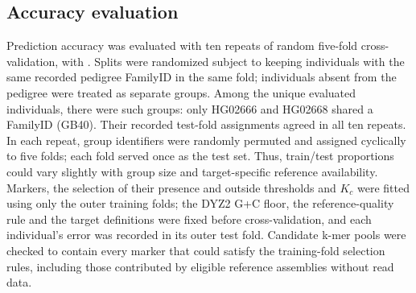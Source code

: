 \subsection{Accuracy evaluation}\label{sec:m-benchmark}
Prediction accuracy was evaluated with ten repeats of random five-fold cross-validation, with . Splits were randomized subject to keeping individuals with the same recorded pedigree FamilyID in the same fold; individuals absent from the pedigree were treated as separate groups. Among the  unique evaluated individuals, there were  such groups: only HG02666 and HG02668 shared a FamilyID (GB40). Their recorded test-fold assignments agreed in all ten repeats. In each repeat, group identifiers were randomly permuted and assigned cyclically to five folds; each fold served once as the test set. Thus, train/test proportions could vary slightly with group size and target-specific reference availability. Markers, the selection of their presence and outside thresholds and $K_c$ were fitted using only the outer training folds; the DYZ2 G+C floor, the reference-quality rule and the target definitions were fixed before cross-validation, and each individual's error was recorded in its outer test fold. Candidate k-mer pools were checked to contain every marker that could satisfy the training-fold selection rules, including those contributed by eligible reference assemblies without read data. 

